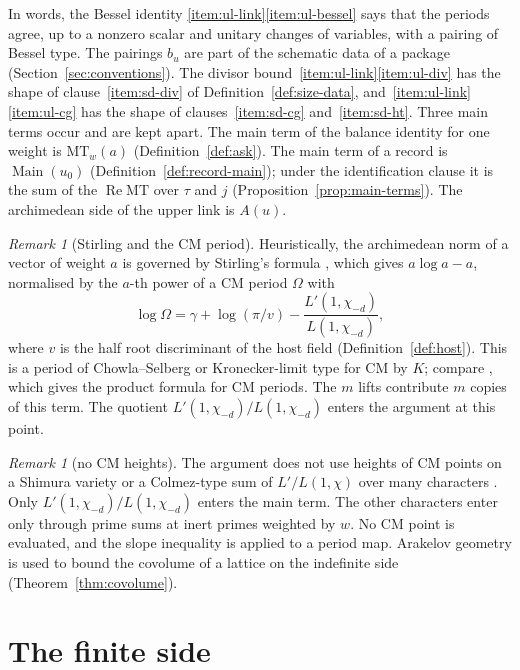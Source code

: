 \documentclass[11pt]{amsbook}
\theoremstyle{plain}
\theoremstyle{definition}
\theoremstyle{remark}
\newtheorem{remark}[theorem]{Remark}
\numberwithin{equation}{section}
\numberwithin{figure}{chapter}
\numberwithin{table}{chapter}
\newcommand{\MT}{\mathrm{MT}}
\newcommand{\Main}{\operatorname{Main}}
\begin{document}
\noindent In words, the Bessel identity
\ref{item:ul-link}\ref{item:ul-bessel} says that the periods agree, up
to a nonzero scalar and unitary changes of variables, with a pairing
of Bessel type. The pairings $b_u$
are part of the schematic data of a package
(Section~\ref{sec:conventions}). The
divisor bound~\ref{item:ul-link}\ref{item:ul-div} has the shape of
clause~\ref{item:sd-div} of
Definition~\ref{def:size-data}, and~\ref{item:ul-link}\ref{item:ul-cg} has the
shape of
clauses~\ref{item:sd-cg} and~\ref{item:sd-ht}. Three main terms occur and are
kept apart.
The main term of the balance identity for one weight is $\MT_w(a)$
(Definition~\ref{def:ask}). The main term of a record is $\Main(u_0)$
(Definition~\ref{def:record-main}); under the identification clause it
is the sum of the $\operatorname{Re}\MT$ over $\tau$ and $j$
(Proposition~\ref{prop:main-terms}). The archimedean side of the upper
link is $A(u)$.

\begin{remark}[Stirling and the CM period]\label{rem:stirling}
Heuristically, the archimedean norm of a vector of weight $a$ is
governed by Stirling's formula \cite[(5.11.1)]{DLMF2026}, which gives
$a\log a-a$, normalised by the $a$-th power of a CM period $\Omega$
with
\[
\log\Omega=\gamma+\log(\pi/v)-\frac{L'(1,\chi_{-d})}{L(1,\chi_{-d})},
\]
where $v$ is the half root discriminant of the host field
(Definition~\ref{def:host}). This is a period of Chowla--Selberg or
Kronecker-limit type for CM by
$K$; compare \cite{ChowlaSelberg1967}, which gives the product formula
for CM periods. The $m$ lifts contribute $m$ copies of this term. The
quotient $L'(1,\chi_{-d})/L(1,\chi_{-d})$ enters the argument at this
point.
\end{remark}

\begin{remark}[no CM heights]\label{rem:no-colmez}
The argument does not use heights of CM points on a Shimura variety
or a Colmez-type sum of $L'/L(1,\chi)$ over many characters
\cite{Colmez1993}. Only
$L'(1,\chi_{-d})/L(1,\chi_{-d})$ enters the main term. The other
characters enter only through prime sums at inert primes weighted by
$w$. No CM point is evaluated, and the slope inequality is applied to a
period map. Arakelov geometry is used to bound the covolume of a
lattice on the indefinite side (Theorem~\ref{thm:covolume}).
\end{remark}

\section{The finite side}
\end{document}
